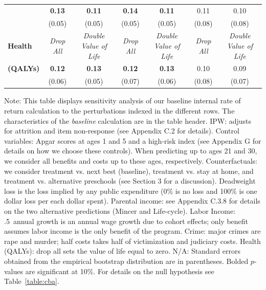 \documentclass[static]{JJH-Beamer}
\begin{document}
\begin{frame}
\begin{table}[H]
\begin{center}
{\begin{tabular}{>{\bfseries}lcc|cc|cc}
	&	\textbf{0.13}	&	\textbf{0.11}	&	\textbf{0.14}	&	\textbf{0.11}	&	0.11	&	0.10	\\
	&	(0.05)	&	(0.05)	&	(0.05)	&	(0.05)	&	(0.08)	&	(0.08)	\\ \midrule
Health	&	\textit{Drop All}	&	\textit{Double Value of Life}	&	\textit{Drop All}	&	\textit{Double Value of Life}	&	\textit{Drop All}	&	\textit{Double Value of Life}	\\
(QALYs)	&	\textbf{0.12}	&	\textbf{0.13}	&	\textbf{0.12}	&	\textbf{0.13}	&	0.10	&	0.09	\\
	&	(0.06)	&	(0.05)	&	(0.07)	&	(0.06)	&	(0.08)	&	(0.07)	\\ \bottomrule
\end{tabular}
}
\end{center}
\end{table}

\end{frame}

{\flushleft \small Note: This table displays sensitivity analysis of our baseline internal rate of return calculation to the perturbations indexed in the different rows. The characteristics of the \textit{baseline} calculation are in the table header. IPW: adjusts for attrition and item non-response (see Appendix C.2 for details). Control variables: Apgar scores at ages 1 and 5 and a high-risk index (see Appendix G for details on how we choose these controls). When predicting up to ages 21 and 30, we consider all benefits and costs up to these ages, respectively. Counterfactuals: we consider treatment vs. next best (baseline), treatment vs. stay at home, and treatment vs. alternative preschools (see Section 3 for a discussion). Deadweight loss is the loss implied by any public expenditure (0\% is no loss and 100\% is one dollar loss per each dollar spent). Parental income: see Appendix C.3.8 for details on the two alternative predictions (Mincer and Life-cycle). Labor Income: .5\ annual growth is an annual wage growth due to cohort effects; only benefit assumes labor income is the only benefit of the program. Crime: major crimes are rape and murder; half costs takes half of victimization and judiciary costs. Health (QALYs): drop all sets the value of life equal to zero. N/A: Standard errors obtained from the empirical bootstrap distribution are in parentheses. Bolded $p$-values are significant at 10\%. For details on the null hypothesis see Table~\ref{table:cba}.\\}
\clearpage
\end{document}
